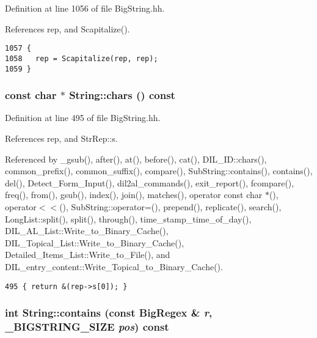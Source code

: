 Definition at line 1056 of file Big\-String.hh.

References rep, and Scapitalize().



\footnotesize\begin{verbatim}1057 {
1058   rep = Scapitalize(rep, rep);
1059 }
\end{verbatim}\normalsize 
{}
\subsubsection{\setlength{\rightskip}{0pt plus 5cm}const char $\ast$ String::chars () const\hspace{0.3cm}{\tt  [inline]}}\label{classString_a104}




Definition at line 495 of file Big\-String.hh.

References rep, and Str\-Rep::s.

Referenced by \_\-gsub(), after(), at(), before(), cat(), DIL\_\-ID::chars(), common\_\-prefix(), common\_\-suffix(), compare(), Sub\-String::contains(), contains(), del(), Detect\_\-Form\_\-Input(), dil2al\_\-commands(), exit\_\-report(), fcompare(), freq(), from(), gsub(), index(), join(), matches(), operator const char $\ast$(), operator$<$$<$(), Sub\-String::operator=(), prepend(), replicate(), search(), Long\-List::split(), split(), through(), time\_\-stamp\_\-time\_\-of\_\-day(), DIL\_\-AL\_\-List::Write\_\-to\_\-Binary\_\-Cache(), DIL\_\-Topical\_\-List::Write\_\-to\_\-Binary\_\-Cache(), Detailed\_\-Items\_\-List::Write\_\-to\_\-File(), and DIL\_\-entry\_\-content::Write\_\-Topical\_\-to\_\-Binary\_\-Cache().



\footnotesize\begin{verbatim}495 { return &(rep->s[0]); }
\end{verbatim}\normalsize 
{}
\subsubsection{\setlength{\rightskip}{0pt plus 5cm}int String::contains (const {\bf Big\-Regex} \& {\em r}, {\bf \_\-BIGSTRING\_\-SIZE} {\em pos}) const\hspace{0.3cm}{\tt  [inline]}}\label{classString_a41}




